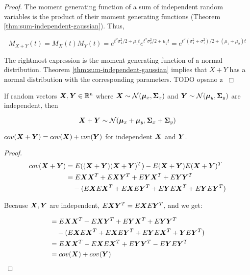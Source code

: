 \begin{proof}
  The moment generating function of a sum of independent random variables is
  the product of their moment generating functions (Theorem
  \ref{thm:sum-independent-gaussian}). Thus,

  \begin{equation}
    M_{X + Y}(t) = M_X(t) M_Y(t) = e^{t^2 \sigma_1^2 / 2 + \mu_1 t} e^{t^2 \sigma_2^2 / 2 + \mu_2 t} = e^{t^2 (\sigma_1^2 + \sigma_1^2) / 2 + (\mu_1 + \mu_2) t}
  \end{equation}

  The rightmost expression is the moment generating function of a normal
  distribution. Theorem \ref{thm:sum-independent-gaussian} implies that $X +
  Y$ has a normal distribution with the corresponding parameters. {TODO
  opsano z \citep{mitzenmacher2017probability}}
\end{proof}

\begin{thm}
  If random vectors ${\bm{X}}, {\bm{Y}} \in {\mathbb{R}}^n$ where ${\bm{X}} \sim {\mathcal{N}}({\bm{\mu}}_x,
  {\bm{\Sigma}}_x)$ and ${\bm{Y}} \sim {\mathcal{N}}({\bm{\mu}}_y, {\bm{\Sigma}}_y)$ are independent, then

  \begin{equation}
    {\bm{X}} + {\bm{Y}} \sim {\mathcal{N}}({\bm{\mu}}_x + {\bm{\mu}}_y, {\bm{\Sigma}}_x + {\bm{\Sigma}}_y)
  \end{equation}
\end{thm}

\begin{thm}
  $cov({\bm{X}} + {\bm{Y}}) = cov({\bm{X}}) + cov({\bm{Y}})$ for independent ${\bm{X}}$ and ${\bm{Y}}$.
\end{thm}

\begin{proof}
  \begin{align}
    cov({\bm{X}} + {\bm{Y}}) &= E(({\bm{X}} + {\bm{Y}}) ({\bm{X}} + {\bm{Y}})^T) - E({\bm{X}} + {\bm{Y}})E({\bm{X}} + {\bm{Y}})^T \\
                   &= E{\bm{X}}{\bm{X}}^T + E{\bm{X}}{\bm{Y}}^T + E{\bm{Y}}{\bm{X}}^T + E{\bm{Y}}{\bm{Y}}^T \\
                   &\quad - (E{\bm{X}} E{\bm{X}}^T + E{\bm{X}} E{\bm{Y}}^T + E{\bm{Y}} E{\bm{X}}^T + E {\bm{Y}} E{\bm{Y}}^T)
  \end{align}

  Because ${\bm{X}}, {\bm{Y}}$ are independent, $E {\bm{X}} {\bm{Y}}^T = E {\bm{X}} E {\bm{Y}}^T$, and we get:

  \begin{align}
      &= E{\bm{X}}{\bm{X}}^T + E{\bm{X}} {\bm{Y}}^T + E{\bm{Y}}{\bm{X}}^T + E{\bm{Y}}{\bm{Y}}^T \\
      &\quad - (E{\bm{X}} E{\bm{X}}^T + E{\bm{X}} E{\bm{Y}}^T + E{\bm{Y}} E{\bm{X}}^T + {\bm{Y}} E{\bm{Y}}^T) \\
      &= E{\bm{X}}{\bm{X}}^T - E{\bm{X}} E{\bm{X}}^T + E{\bm{Y}} {\bm{Y}}^T - E{\bm{Y}} E{\bm{Y}}^T \\
      &= cov({\bm{X}}) + cov({\bm{Y}})
  \end{align}
\end{proof}

